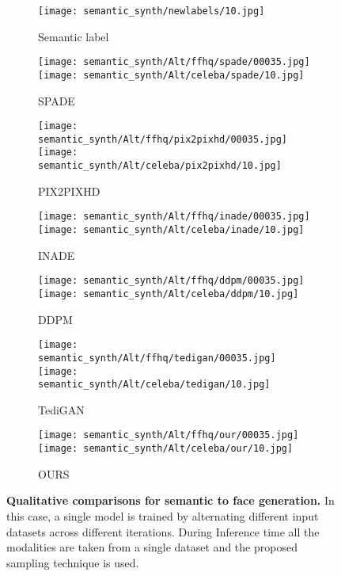 \documentclass[10pt,twocolumn,letterpaper]{article}
\begin{document}
\begin{figure*}[t!]
\begin{subfigure}[t]{0.137\linewidth}
      \texttt{[image: semantic\_synth/newlabels/10.jpg]}
\caption{Semantic label}
    \end{subfigure}
    \begin{subfigure}[t]{0.137\linewidth}
      \captionsetup{justification=centering, labelformat=empty, font=scriptsize}
      \texttt{[image: semantic\_synth/Alt/ffhq/spade/00035.jpg]}
\texttt{[image: semantic\_synth/Alt/celeba/spade/10.jpg]}
\caption{SPADE\cite{park2019SPADE}}
    \end{subfigure}
    \begin{subfigure}[t]{0.137\linewidth}
      \captionsetup{justification=centering, labelformat=empty, font=scriptsize}
      \texttt{[image: semantic\_synth/Alt/ffhq/pix2pixhd/00035.jpg]}
\texttt{[image: semantic\_synth/Alt/celeba/pix2pixhd/10.jpg]}
\caption{PIX2PIXHD\cite{wang2018pix2pixHD}}
    \end{subfigure}
    \begin{subfigure}[t]{0.137\linewidth}
      \captionsetup{justification=centering, labelformat=empty, font=scriptsize}
      \texttt{[image: semantic\_synth/Alt/ffhq/inade/00035.jpg]}
\texttt{[image: semantic\_synth/Alt/celeba/inade/10.jpg]}
\caption{INADE\cite{tan2021diverse}}
    \end{subfigure}
    \begin{subfigure}[t]{0.137\linewidth}
      \captionsetup{justification=centering, labelformat=empty, font=scriptsize}
      \texttt{[image: semantic\_synth/Alt/ffhq/ddpm/00035.jpg]}
\texttt{[image: semantic\_synth/Alt/celeba/ddpm/10.jpg]}
\caption{DDPM\cite{ho2020denoising}}
    \end{subfigure}
    \begin{subfigure}[t]{0.137\linewidth}
      \captionsetup{justification=centering, labelformat=empty, font=scriptsize}
      \texttt{[image: semantic\_synth/Alt/ffhq/tedigan/00035.jpg]}
\texttt{[image: semantic\_synth/Alt/celeba/tedigan/10.jpg]}
\caption{TediGAN\cite{xia2021tedigan}}
    \end{subfigure}
    \begin{subfigure}[t]{0.137\linewidth}
      \captionsetup{justification=centering, labelformat=empty, font=scriptsize}
      \texttt{[image: semantic\_synth/Alt/ffhq/our/00035.jpg]}
\texttt{[image: semantic\_synth/Alt/celeba/our/10.jpg]}
\caption{OURS}
    \end{subfigure}
    \vspace{-3mm}    \caption{\textbf{Qualitative comparisons for semantic to face generation.} In this case, a single model is trained by alternating different input datasets across different iterations. During Inference time all the modalities are taken from a single dataset and the proposed sampling technique is used.}
    \label{fig:facesematic}
  \end{figure*}
\end{document}
